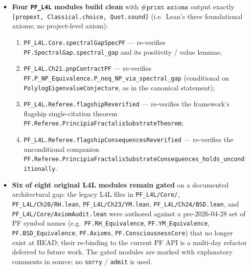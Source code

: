 \begin{itemize}
\item \textbf{Four \texttt{PF\_L4L} modules build clean} with
$\texttt{\#print axioms}$ output exactly
\texttt{[propext, Classical.\allowbreak{}choice, Quot.\allowbreak{}sound]} (i.e.\ Lean's
three foundational axioms; no project-level axiom):
\begin{enumerate}
\item \texttt{PF\_\allowbreak{}L4L.\allowbreak{}Core.\allowbreak{}spectral\allowbreak{}Gap\allowbreak{}Spec\allowbreak{}PF} ---
re-verifies \texttt{PF.SpectralGap.spectral\_gap} and its
positivity / value lemmas;
\item \texttt{PF\_L4L.Ch21.pnpContractPF} ---
re-verifies \texttt{PF.\allowbreak{}P\_\allowbreak{}NP\_\allowbreak{}Equivalence.\allowbreak{}P\_\allowbreak{}neq\_\allowbreak{}NP\_\allowbreak{}via\_\allowbreak{}spectral\_\allowbreak{}gap}
(conditional on \texttt{PolylogEigenvalueConjecture}, as in the
canonical statement);
\item \texttt{PF\_\allowbreak{}L4L.\allowbreak{}Referee.\allowbreak{}flagship\allowbreak{}Reverified} ---
re-verifies the framework's flagship single-citation theorem
\texttt{PF.\allowbreak{}Referee.\allowbreak{}Principia\allowbreak{}Fractalis\allowbreak{}Substrate\allowbreak{}Theorem};
\item \texttt{PF\_\allowbreak{}L4L.\allowbreak{}Referee.\allowbreak{}flagship\allowbreak{}Consequences\allowbreak{}Reverified} ---
re-verifies the unconditional companion
\texttt{PF.\allowbreak{}Referee.\allowbreak{}Principia\allowbreak{}Fractalis\allowbreak{}Substrate\allowbreak{}Consequences\_\allowbreak{}holds\_\allowbreak{}unconditionally}.
\end{enumerate}

\item \textbf{Six of eight original L4L modules remain gated} on
a documented architectural gap: the legacy L4L files in
\texttt{PF\_L4L/Core/}, \texttt{PF\_L4L/Ch20/RH.lean},
\texttt{PF\_L4L/Ch23/YM.lean}, \texttt{PF\_L4L/Ch24/BSD.lean}, and
\texttt{PF\_L4L/Core/AxiomAudit.lean} were authored against a
pre-2026-04-28 set of PF symbol names (e.g.\
\texttt{PF.RH\_Equivalence}, \texttt{PF.YM\_Equivalence},
\texttt{PF.BSD\_Equivalence}, \texttt{PF.Axioms},
\texttt{PF.ConsciousnessCore}) that no longer exist at HEAD; their
re-binding to the current PF API is a multi-day refactor deferred
to future work. The gated modules are marked with explanatory
comments in source; no \texttt{sorry} / \texttt{admit} is used.


\end{itemize}
